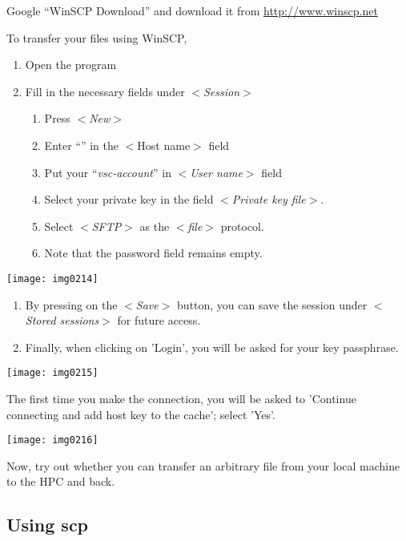   Google ``WinSCP Download'' and download it from \url{http://www.winscp.net}

  To transfer your files using WinSCP,

  \begin{enumerate}
  \item  Open the program
  \item  Fill in the necessary fields under $<$\emph{Session}$>$
  \begin{enumerate}
  \item  Press $<$\emph{New}$>$
  \item  Enter ``\emph{\loginnode}'' in the $<$Host name$>$ field
  \item  Put your ``\emph{vsc-account}'' in $<$\emph{User name}$>$ field
  \item  Select your private key in the field $<$\emph{Private key file}$>$.
  \item  Select $<$\emph{SFTP}$>$ as the $<$\emph{file}$>$ protocol.
  \item  Note that the password field remains empty.
  \end{enumerate}
  \end{enumerate}

  \texttt{[image: img0214]}

  \begin{enumerate}
  \item  By pressing on the $<$\emph{Save}$>$ button, you can save the session under $<$\emph{Stored sessions}$>$ for future access.
  \item  Finally, when clicking on 'Login', you will be asked for your key passphrase.
  \end{enumerate}

  \texttt{[image: img0215]}

  The first time you make the connection, you will be asked to 'Continue
  connecting and add host key to the cache'; select 'Yes'.

  \texttt{[image: img0216]}

  Now, try out whether you can transfer an arbitrary file from your local machine to the HPC and back.

\fi

\ifmacORlinux
  \subsection{Using scp}


